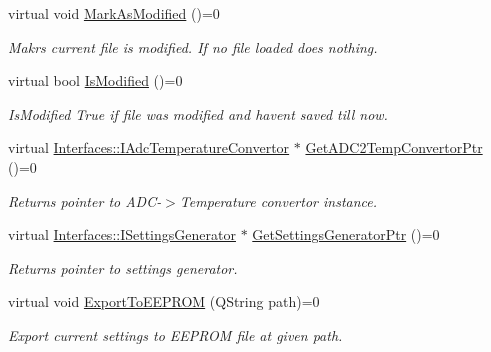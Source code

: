 \begin{DoxyCompactItemize}
\mbox{\label{class_interfaces_1_1_i_settings_saver_loader_aba09cbe4cc05e6cef67c41789bdccd23}} 
virtual void \hyperlink{class_interfaces_1_1_i_settings_saver_loader_aba09cbe4cc05e6cef67c41789bdccd23}{Mark\+As\+Modified} ()=0
\begin{DoxyCompactList}\small\item\em Makrs current file is modified. If no file loaded does nothing. \end{DoxyCompactList}\item 
virtual bool \hyperlink{class_interfaces_1_1_i_settings_saver_loader_a4c3f69d0bc7c355030c8d371367108d3}{Is\+Modified} ()=0
\begin{DoxyCompactList}\small\item\em Is\+Modified True if file was modified and haven\textquotesingle{}t saved till now. \end{DoxyCompactList}\item 
virtual \hyperlink{class_interfaces_1_1_i_adc_temperature_convertor}{Interfaces\+::\+I\+Adc\+Temperature\+Convertor} $\ast$ \hyperlink{class_interfaces_1_1_i_settings_saver_loader_a44d68d2bc7de1717bc41ee264db13ac5}{Get\+A\+D\+C2\+Temp\+Convertor\+Ptr} ()=0
\begin{DoxyCompactList}\small\item\em Returns pointer to A\+D\+C-\/$>$Temperature convertor instance. \end{DoxyCompactList}\item 
virtual \hyperlink{class_interfaces_1_1_i_settings_generator}{Interfaces\+::\+I\+Settings\+Generator} $\ast$ \hyperlink{class_interfaces_1_1_i_settings_saver_loader_a73c8012dc63ca02d65a013ca901840ba}{Get\+Settings\+Generator\+Ptr} ()=0
\begin{DoxyCompactList}\small\item\em Returns pointer to settings generator. \end{DoxyCompactList}\item 
virtual void \hyperlink{class_interfaces_1_1_i_settings_saver_loader_a4f855492363276d81031d931a72a49a3}{Export\+To\+E\+E\+P\+R\+OM} (Q\+String path)=0
\begin{DoxyCompactList}\small\item\em Export current settings to E\+E\+P\+R\+OM file at given path. \end{DoxyCompactList}\end{DoxyCompactItemize}
